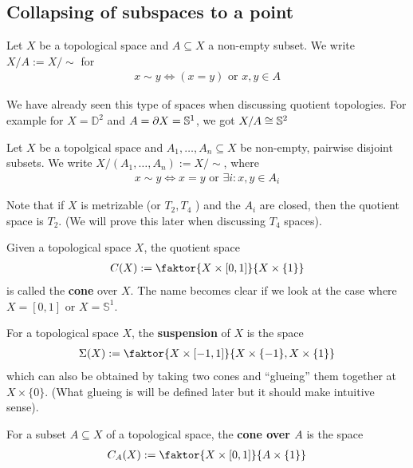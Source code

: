 \subsection{Collapsing of subspaces to a point}
\begin{dfn}[]
Let $X$ be a topological space and $A \subseteq X$ a non-empty subset.
We write $X/A := X/\sim$ for 
\begin{align*}
  x \sim y \iff (x = y) \text{ or } x,y \in A
\end{align*}
\end{dfn}
We have already seen this type of spaces when discussing quotient topologies.
For example for $X = \mathbb{D}^{2}$ and $A = \partial X = \mathbb{S}^{1}$, we got $X/A \cong \mathbb{S}^{2}$


\begin{dfn}[]
Let $X$ be a topolgical space and $A_{1}, \ldots, A_{n} \subseteq X$ be non-empty, pairwise disjoint subsets. 
We write $X/\left(
  A_{1}, \ldots, A_{n}
\right) := X/\sim$, where
\begin{align*}
  x \sim y \iff x = y \text{ or } \exists i: x,y \in A_i
\end{align*}
\end{dfn}
Note that if $X$ is metrizable (or $T_2,T_4$ ) and the $A_i$ are closed, then the quotient space is $T_2$. (We will prove this later when discussing $T_4$ spaces).

\begin{ex}
  Given a topological space $X$, the quotient space 
  \begin{align*}
    C(X) :=
    \faktor{X \times [0,1]}{X \times \{1\}}
  \end{align*}
  is called the \textbf{cone} over $X$.
  The name becomes clear if we look at the case where $X = [0,1]$ or $X = \mathbb{S}^{1}$.
\end{ex}

\begin{ex}[Suspension]
  For a topological space $X$, the \textbf{suspension} of $X$ is the space
  \begin{align*}
    \Sigma(X) := \faktor{X \times [-1,1]}{X \times \{-1\}, X \times \{1\}}
  \end{align*}
  which can also be obtained by taking two cones and ``glueing'' them together at $X \times \{0\}$. 
  (What glueing is will be defined later but it should make intuitive sense).
\end{ex}

\begin{ex}[]
For a subset $A \subseteq X$ of a topological space, the \textbf{cone over $A$} is the space
\begin{align*}
  C_A(X) := \faktor{X \times [0,1]}{A \times \{1\}}
\end{align*}
\end{ex}

